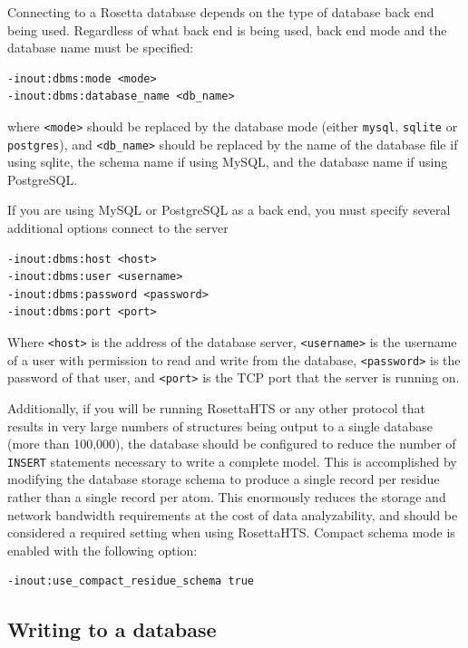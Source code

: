 Connecting to a Rosetta database depends on the type of database back end being used.  Regardless of what back end is being used, back end mode and the database name must be specified:

\singlespace
\begin{Verbatim}
-inout:dbms:mode <mode>
-inout:dbms:database_name <db_name>
\end{Verbatim}
\doublespace

where \texttt{<mode>} should be replaced by the database mode (either \texttt{mysql}, \texttt{sqlite} or \texttt{postgres}), and \texttt{<db\_name>} should be replaced by the name of the database file if using sqlite, the schema name if using MySQL, and the database name if using PostgreSQL.

If you are using MySQL or PostgreSQL as a back end, you must specify several additional options connect to the server

\singlespace
\begin{Verbatim}
-inout:dbms:host <host>
-inout:dbms:user <username>
-inout:dbms:password <password>
-inout:dbms:port <port>
\end{Verbatim}
\doublespace

Where \texttt{<host>} is the address of the database server, \texttt{<username>} is the username of a user with permission to read and write from the database, \texttt{<password>} is the password of that user, and \texttt{<port>} is the TCP port that the server is running on. 

Additionally, if you will be running RosettaHTS or any other protocol that results in very large numbers of structures being output to a single database (more than 100,000), the database should be configured to reduce the number of \texttt{INSERT} statements necessary to write a complete model.
This is accomplished by modifying the database storage schema to produce a single record per residue rather than a single record per atom.  This enormously reduces the storage and network bandwidth requirements at the cost of data analyzability, and should be considered a required setting when using RosettaHTS.
Compact schema mode is enabled with the following option:

\singlespace
\begin{Verbatim}
-inout:use_compact_residue_schema true
\end{Verbatim}
\doublespace

\subsection{Writing to a database}


